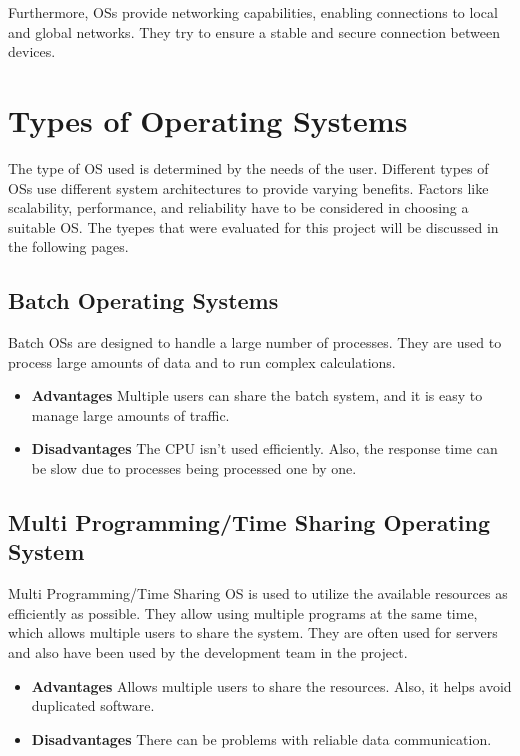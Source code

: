 Furthermore, OSs provide networking capabilities, enabling connections to local and global networks. They try to ensure a stable and secure connection between devices.

\cite{WhatIsAnOs}

\section {Types of Operating Systems}

The type of OS used is determined by the needs of the user. 
Different types of OSs use different system architectures to provide varying benefits.
Factors like scalability, performance, and reliability have to be considered in choosing a suitable OS.
The tyepes that were evaluated for this project will be discussed in the following pages. 

\cite{TypesOfOs}

\subsection{Batch Operating Systems}

    Batch OSs are designed to handle a large number of processes. They are used to process large amounts of data and to run complex calculations.
  
    \begin{itemize}
        \item \textbf{Advantages} Multiple users can share the batch system, and it is easy to manage large amounts of traffic.
        \item \textbf{Disadvantages} The CPU isn't used efficiently. Also, the response time can be slow due to processes being processed one by one.
    \end{itemize} 

\subsection{Multi Programming/Time Sharing Operating System}

    Multi Programming/Time Sharing OS is used to utilize the available resources as efficiently as possible. They allow using multiple programs at the same time, which allows multiple users to share the system.
    They are often used for servers and also have been used by the development team in the project.

    \begin{itemize}
        \item \textbf{Advantages} Allows multiple users to share the resources. Also, it helps avoid duplicated software.
        \item \textbf{Disadvantages} There can be problems with reliable data communication. 
    \end{itemize} 

